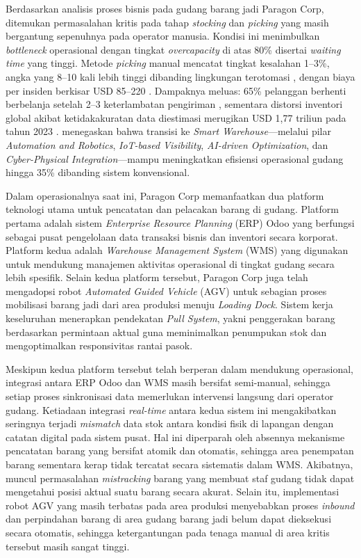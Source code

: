 Berdasarkan analisis proses bisnis pada gudang barang jadi Paragon Corp, ditemukan permasalahan kritis pada tahap \textit{stocking} dan \textit{picking} yang masih bergantung sepenuhnya pada operator manusia. Kondisi ini menimbulkan \textit{bottleneck} operasional dengan tingkat \textit{overcapacity} di atas 80\% disertai \textit{waiting time} yang tinggi. Metode \textit{picking} manual mencatat tingkat kesalahan 1--3\%, angka yang 8--10 kali lebih tinggi dibanding lingkungan terotomasi \autocite{netsuite2024}, dengan biaya per insiden berkisar USD 85--220 \autocite{scmchamps2024}. Dampaknya meluas: 65\% pelanggan berhenti berbelanja setelah 2--3 keterlambatan pengiriman \autocite{conexiom2024}, sementara distorsi inventori global akibat ketidakakuratan data diestimasi merugikan USD 1,77 triliun pada tahun 2023 \autocite{ihlgroup2023}. \textcite{vangeest2021} menegaskan bahwa transisi ke \textit{Smart Warehouse}---melalui pilar \textit{Automation and Robotics}, \textit{IoT-based Visibility}, \textit{AI-driven Optimization}, dan \textit{Cyber-Physical Integration}---mampu meningkatkan efisiensi operasional gudang hingga 35\% dibanding sistem konvensional.

Dalam operasionalnya saat ini, Paragon Corp memanfaatkan dua platform teknologi utama untuk pencatatan dan pelacakan barang di gudang. Platform pertama adalah sistem \textit{Enterprise Resource Planning} (ERP) Odoo yang berfungsi sebagai pusat pengelolaan data transaksi bisnis dan inventori secara korporat. Platform kedua adalah \textit{Warehouse Management System} (WMS) yang digunakan untuk mendukung manajemen aktivitas operasional di tingkat gudang secara lebih spesifik. Selain kedua platform tersebut, Paragon Corp juga telah mengadopsi robot \textit{Automated Guided Vehicle} (AGV) untuk sebagian proses mobilisasi barang jadi dari area produksi menuju \textit{Loading Dock}. Sistem kerja keseluruhan menerapkan pendekatan \textit{Pull System}, yakni penggerakan barang berdasarkan permintaan aktual guna meminimalkan penumpukan stok dan mengoptimalkan responsivitas rantai pasok.

Meskipun kedua platform tersebut telah berperan dalam mendukung operasional, integrasi antara ERP Odoo dan WMS masih bersifat semi-manual, sehingga setiap proses sinkronisasi data memerlukan intervensi langsung dari operator gudang. Ketiadaan integrasi \textit{real-time} antara kedua sistem ini mengakibatkan seringnya terjadi \textit{mismatch} data stok antara kondisi fisik di lapangan dengan catatan digital pada sistem pusat. Hal ini diperparah oleh absennya mekanisme pencatatan barang yang bersifat atomik dan otomatis, sehingga area penempatan barang sementara kerap tidak tercatat secara sistematis dalam WMS. Akibatnya, muncul permasalahan \textit{mistracking} barang yang membuat staf gudang tidak dapat mengetahui posisi aktual suatu barang secara akurat. Selain itu, implementasi robot AGV yang masih terbatas pada area produksi menyebabkan proses \textit{inbound} dan perpindahan barang di area gudang barang jadi belum dapat dieksekusi secara otomatis, sehingga ketergantungan pada tenaga manual di area kritis tersebut masih sangat tinggi.

